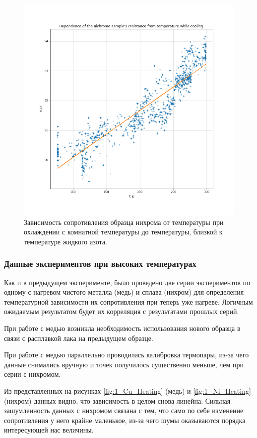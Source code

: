 \documentclass[a4paper, 12pt]{article}
\begin{document}
\begin{figure}[H]
	\centering
	\includegraphics[width=\linewidth]{1_Ni_Cooling}
	\caption{Зависимость сопротивления образца нихрома от температуры при охлаждении с комнатной температуры до температуры, близкой к температуре жидкого азота.}
	\label{fig:1_Ni_Cooling}
\end{figure}


\subsubsection{Данные экспериментов при высоких температурах}
Как и в предыдущем эксперименте, было проведено две серии экспериментов по одному с нагревом чистого металла (медь) и сплава (нихром) для определения температурной зависимости их сопротивления при теперь уже нагреве. Логичным ожидаемым результатом будет их корреляция с результатами прошлых серий.

При работе с медью возникла необходимость использования нового образца в связи с расплавкой лака на предыдущем образце.

При работе с медью параллельно проводилась калибровка термопары, из-за чего данные снимались вручную и точек получилось существенно меньше, чем при серии с нихромом.

Из представленных на рисунках \ref{fig:1_Cu_Heating} (медь) и \ref{fig:1_Ni_Heating} (нихром) данных видно, что зависимость в целом снова линейна. Сильная зашумленность данных с нихромом связана с тем, что само по себе изменение сопротивления у него крайне маленькое, из-за чего шумы оказываются порядка интересующей нас величины.
\end{document}
